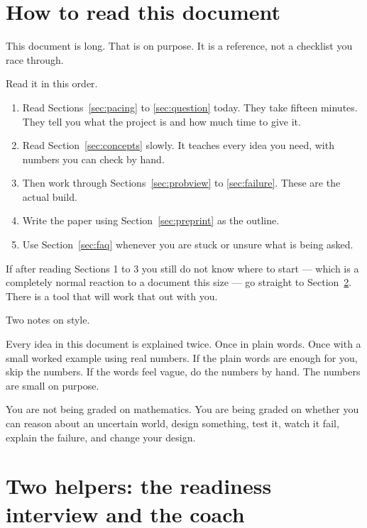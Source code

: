 \documentclass[11pt,a4paper]{article}
\begin{document}
\section{How to read this document}

This document is long. That is on purpose. It is a reference, not a checklist you race through.

Read it in this order.

\begin{enumerate}
  \item Read Sections~\ref{sec:pacing} to \ref{sec:question} today. They take fifteen minutes.
        They tell you what the project is and how much time to give it.
  \item Read Section~\ref{sec:concepts} slowly. It teaches every idea you need, with numbers you
        can check by hand.
  \item Then work through Sections~\ref{sec:probview} to \ref{sec:failure}. These are the actual build.
  \item Write the paper using Section~\ref{sec:preprint} as the outline.
  \item Use Section~\ref{sec:faq} whenever you are stuck or unsure what is being asked.
\end{enumerate}

If after reading Sections 1 to 3 you still do not know where to start --- which is a completely
normal reaction to a document this size --- go straight to Section~\ref{sec:skills}. There is a
tool that will work that out with you.

Two notes on style.

Every idea in this document is explained twice. Once in plain words. Once with a small
worked example using real numbers. If the plain words are enough for you, skip the numbers.
If the words feel vague, do the numbers by hand. The numbers are small on purpose.

You are not being graded on mathematics. You are being graded on whether you can reason
about an uncertain world, design something, test it, watch it fail, explain the failure,
and change your design.

\section{Two helpers: the readiness interview and the coach}
\label{sec:skills}
\end{document}
